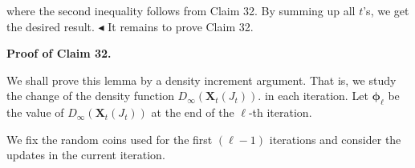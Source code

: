 \documentclass[10pt,a4paper]{article}
\begin{document}
where the second inequality follows from Claim 32.
By summing up all $t$’s, we get the desired result.
$\blacktriangleleft$
It remains to prove Claim 32.\par





\par\medskip\noindent\textbf{
\textbf{Proof of Claim 32}.}\par




We shall prove this lemma by a density increment argument.
That is, we study the change of the density function $D_{\infty}(\bm{X}_{t}(J_{t})).$ in each iteration.
Let $\bm{\phi_{\ell}}$ be the value of $D_{\infty}(\bm{X}_{t}(J_{t}))$ at the end of the $\ell$-th iteration.\par




We fix the random coins used for the first $(\ell-1)$ iterations and consider the updates in the current iteration.\par
\end{document}
